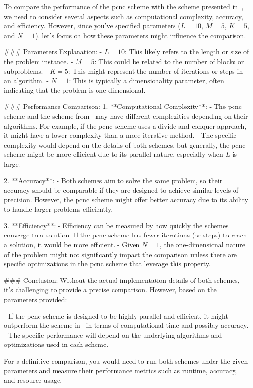 To compare the performance of the \gls{pcnc} scheme with the scheme presented in~\cite{antonioli2023mixed}, we need to consider several aspects such as computational complexity, accuracy, and efficiency. However, since you've specified parameters ($L=10$, $M=5$, $K=5$, and $N=1$), let's focus on how these parameters might influence the comparison.

### Parameters Explanation:
- \( L = 10 \): This likely refers to the length or size of the problem instance.
- \( M = 5 \): This could be related to the number of blocks or subproblems.
- \( K = 5 \): This might represent the number of iterations or steps in an algorithm.
- \( N = 1 \): This is typically a dimensionality parameter, often indicating that the problem is one-dimensional.

### Performance Comparison:
1. **Computational Complexity**:
   - The \gls{pcnc} scheme and the scheme from~\cite{antonioli2023mixed} may have different complexities depending on their algorithms. For example, if the \gls{pcnc} scheme uses a divide-and-conquer approach, it might have a lower complexity than a more iterative method.
   - The specific complexity would depend on the details of both schemes, but generally, the \gls{pcnc} scheme might be more efficient due to its parallel nature, especially when \( L \) is large.

2. **Accuracy**:
   - Both schemes aim to solve the same problem, so their accuracy should be comparable if they are designed to achieve similar levels of precision. However, the \gls{pcnc} scheme might offer better accuracy due to its ability to handle larger problems efficiently.

3. **Efficiency**:
   - Efficiency can be measured by how quickly the schemes converge to a solution. If the \gls{pcnc} scheme has fewer iterations (or steps) to reach a solution, it would be more efficient.
   - Given \( N = 1 \), the one-dimensional nature of the problem might not significantly impact the comparison unless there are specific optimizations in the \gls{pcnc} scheme that leverage this property.

### Conclusion:
Without the actual implementation details of both schemes, it's challenging to provide a precise comparison. However, based on the parameters provided:

- If the \gls{pcnc} scheme is designed to be highly parallel and efficient, it might outperform the scheme in~\cite{antonioli2023mixed} in terms of computational time and possibly accuracy.
- The specific performance will depend on the underlying algorithms and optimizations used in each scheme.

For a definitive comparison, you would need to run both schemes under the given parameters and measure their performance metrics such as runtime, accuracy, and resource usage.